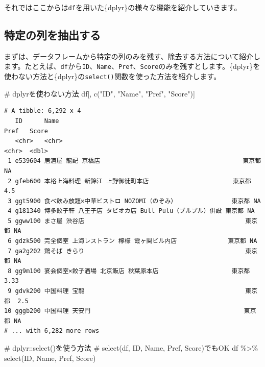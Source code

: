 \documentclass[
  a4paper,
  pandoc,
  ja=standard,
  jafont=haranoaji]{bxjsbook}
\newenvironment{Shaded}{\begin{snugshade}}{\end{snugshade}}
\newcommand{\CommentTok}[1]{\textcolor[rgb]{0.37,0.37,0.37}{#1}}
\newcommand{\FunctionTok}[1]{\textcolor[rgb]{0.28,0.35,0.67}{#1}}
\newcommand{\NormalTok}[1]{\textcolor[rgb]{0.00,0.48,0.65}{#1}}
\newcommand{\SpecialCharTok}[1]{\textcolor[rgb]{0.37,0.37,0.37}{#1}}
\newcommand{\StringTok}[1]{\textcolor[rgb]{0.13,0.47,0.30}{#1}}
\begin{document}
それではここからは\texttt{df}を用いた\{dplyr\}の様々な機能を紹介していきます。

\hypertarget{ux7279ux5b9aux306eux5217ux3092ux62bdux51faux3059ux308b}{%
\subsection{特定の列を抽出する}\label{ux7279ux5b9aux306eux5217ux3092ux62bdux51faux3059ux308b}}

まずは、データフレームから特定の列のみを残す、除去する方法について紹介します。たとえば、\texttt{df}から\texttt{ID}、\texttt{Name}、\texttt{Pref}、\texttt{Score}のみを残すとします。\{dplyr\}を使わない方法と\{dplyr\}の\texttt{select()}関数を使った方法を紹介します。

\begin{Shaded}
\begin{Highlighting}[numbers=left,,]
\CommentTok{\# dplyrを使わない方法}
\NormalTok{df[, }\FunctionTok{c}\NormalTok{(}\StringTok{"ID"}\NormalTok{, }\StringTok{"Name"}\NormalTok{, }\StringTok{"Pref"}\NormalTok{, }\StringTok{"Score"}\NormalTok{)]}
\end{Highlighting}
\end{Shaded}

\begin{verbatim}
# A tibble: 6,292 x 4
   ID      Name                                                     Pref   Score
   <chr>   <chr>                                                    <chr>  <dbl>
 1 e539604 居酒屋 龍記 京橋店                                       東京都 NA   
 2 gfeb600 本格上海料理 新錦江 上野御徒町本店                       東京都  4.5 
 3 ggt5900 食べ飲み放題×中華ビストロ NOZOMI（のぞみ）               東京都 NA   
 4 g181340 博多餃子軒 八王子店 タピオカ店 Bull Pulu（ブルプル）併設 東京都 NA   
 5 ggww100 まさ屋 渋谷店                                            東京都 NA   
 6 gdzk500 完全個室 上海レストラン 檸檬 霞ヶ関ビル内店              東京都 NA   
 7 ga2g202 鶏そば きらり                                            東京都 NA   
 8 gg9m100 宴会個室×餃子酒場 北京飯店 秋葉原本店                    東京都  3.33
 9 gdvk200 中国料理 宝龍                                            東京都  2.5 
10 gggb200 中国料理 天安門                                          東京都 NA   
# ... with 6,282 more rows
\end{verbatim}

\begin{Shaded}
\begin{Highlighting}[numbers=left,,]
\CommentTok{\# dplyr::select()を使う方法}
\CommentTok{\# select(df, ID, Name, Pref, Score)でもOK}
\NormalTok{df }\SpecialCharTok{\%\textgreater{}\%}
  \FunctionTok{select}\NormalTok{(ID, Name, Pref, Score)}
\end{Highlighting}
\end{Shaded}
\end{document}
